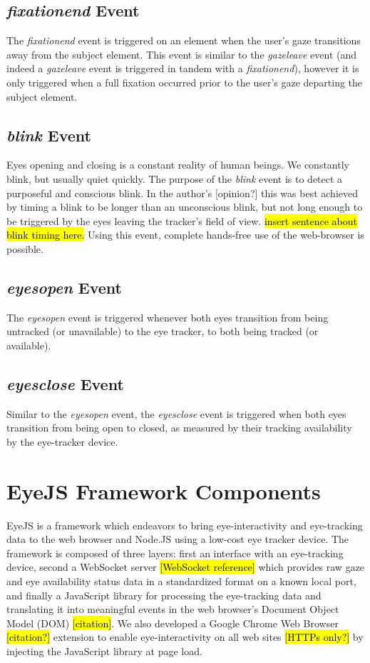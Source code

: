 \documentclass{sigchi}
\begin{document}
\subsection{\textbf{\textit{fixationend}} Event}
The \textit{fixationend} event is triggered on an element when the 
user's gaze transitions away from the subject element. This event is
similar to the \textit{gazeleave} event (and indeed a \textit{gazeleave}
event is triggered in tandem with a \textit{fixationend}), however
it is only triggered when a full fixation occurred prior to the user's
gaze departing the subject element.

\subsection{\textbf{\textit{blink}} Event}
Eyes opening and closing is a constant reality of human beings. We
constantly blink, but usually quiet quickly. The purpose of the 
\textit{blink} event is to detect a purposeful and conscious blink. 
In the author's [opinion?] this was best achieved by timing a blink
to be longer than an unconscious blink, but not long enough to be 
triggered by the eyes leaving the tracker's field of view. \hl{insert
sentence about blink timing here.} Using this event, complete 
hands-free use of the web-browser is possible.

\subsection{\textbf{\textit{eyesopen}} Event}
The \textit{eyesopen} event is triggered whenever both eyes transition
from being untracked (or unavailable) to the eye tracker, to both
being tracked (or available).

\subsection{\textbf{\textit{eyesclose}} Event}
Similar to the \textit{eyesopen} event, the \textit{eyesclose} event
is triggered when both eyes transition from being open to closed, as
measured by their tracking availability by the eye-tracker device.


\section{EyeJS Framework Components}
EyeJS is a framework which endeavors to bring eye-interactivity and
eye-tracking data to the web browser and Node.JS using a low-cost eye
tracker device. The framework is composed of three layers: first
an interface with an eye-tracking device, second a WebSocket server \hl{[WebSocket reference]} which provides raw gaze and eye availability
status data in a standardized format on a known local port, and finally
a JavaScript library for processing the eye-tracking data and
translating it into meaningful events in the web browser's Document
Object Model (DOM) \hl{[citation]}. We also developed a Google
Chrome Web Browser \hl{[citation?]} extension to enable
eye-interactivity on all web sites \hl{[HTTPs only?]} by injecting
the JavaScript library at page load.
\end{document}

